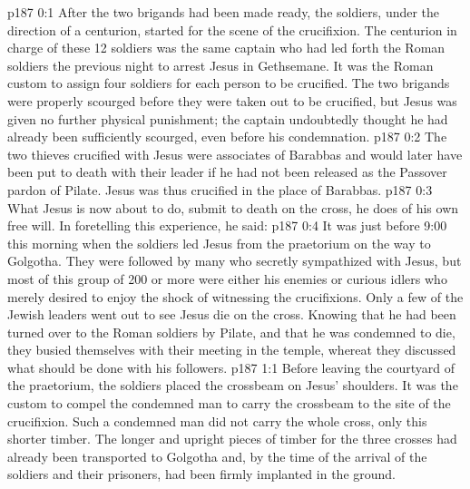 \author{Midwayer Commission}
\vs p187 0:1 After the two brigands had been made ready, the soldiers, under the direction of a centurion, started for the scene of the crucifixion. The centurion in charge of these 12 soldiers was the same captain who had led forth the Roman soldiers the previous night to arrest Jesus in Gethsemane. It was the Roman custom to assign four soldiers for each person to be crucified. The two brigands were properly scourged before they were taken out to be crucified, but Jesus was given no further physical punishment; the captain undoubtedly thought he had already been sufficiently scourged, even before his condemnation.
\vs p187 0:2 The two thieves crucified with Jesus were associates of Barabbas and would later have been put to death with their leader if he had not been released as the Passover pardon of Pilate. Jesus was thus crucified in the place of Barabbas.
\vs p187 0:3 What Jesus is now about to do, submit to death on the cross, he does of his own free will. In foretelling this experience, he said: 
\vs p187 0:4 It was just before 9:00 this morning when the soldiers led Jesus from the praetorium on the way to Golgotha. They were followed by many who secretly sympathized with Jesus, but most of this group of 200 or more were either his enemies or curious idlers who merely desired to enjoy the shock of witnessing the crucifixions. Only a few of the Jewish leaders went out to see Jesus die on the cross. Knowing that he had been turned over to the Roman soldiers by Pilate, and that he was condemned to die, they busied themselves with their meeting in the temple, whereat they discussed what should be done with his followers.
\vs p187 1:1 Before leaving the courtyard of the praetorium, the soldiers placed the crossbeam on Jesus’ shoulders. It was the custom to compel the condemned man to carry the crossbeam to the site of the crucifixion. Such a condemned man did not carry the whole cross, only this shorter timber. The longer and upright pieces of timber for the three crosses had already been transported to Golgotha and, by the time of the arrival of the soldiers and their prisoners, had been firmly implanted in the ground.
